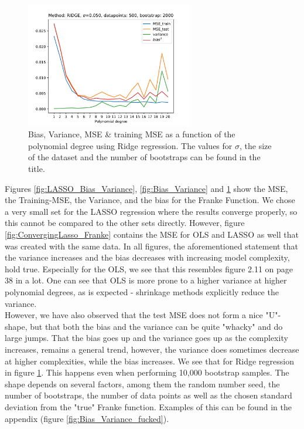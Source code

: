 \documentclass[11pt,a4paper,titlepage]{article}
\begin{document}
\begin{figure}[H]
\centering
\includegraphics[width=0.65\textwidth]{Bias_Variance_RIDGE.pdf}
\caption[Bias, Variance, MSE \& training MSE as a function of the polynomial degree using Ridge regression]{Bias, Variance, MSE \& training MSE as a function of the polynomial degree using Ridge regression. The values for $\sigma$, the size of the dataset and the number of bootstraps can be found in the title.}
\label{fig:Ridge_Bias_Variance}
\end{figure}
Figures \ref{fig:LASSO_Bias_Variance}, \ref{fig:Bias_Variance} and \ref{fig:Ridge_Bias_Variance} show the MSE, the Training-MSE, the Variance, and the bias for the Franke Function. We chose a very small set for the LASSO regression where the results converge properly, so this cannot be compared to the other sets directly. However, figure \ref{fig:ConvergingLasso_Franke} contains the MSE for OLS and LASSO as well that was created with the same data. In all figures, the aforementioned statement that the variance increases and the bias decreases with increasing model complexity, hold true. Especially for the OLS, we see that this resembles  figure 2.11 on page 38 in \citep{hastie01statisticallearning} a lot. One can see that OLS is more prone to a higher variance at higher polynomial degrees, as is expected - shrinkage methods explicitly reduce the variance. \\However, we have also observed that the test MSE does not form a nice "U"-shape, but that both the bias and the variance can be quite "whacky" and do large jumps. That the bias goes up and the variance goes up as the complexity increases, remains a general trend, however, the variance does sometimes decrease at higher complexities, while the bias increases. We see that for Ridge regression in figure \ref{fig:Ridge_Bias_Variance}. This happens even when performing 10,000 bootstrap samples. The shape depends on several factors, among them the random number seed, the number of bootstraps, the number of data points as well as the chosen standard deviation from the "true" Franke function. Examples of this can be found in the appendix (figure \ref{fig:Bias_Variance_fucked}).
\end{document}
